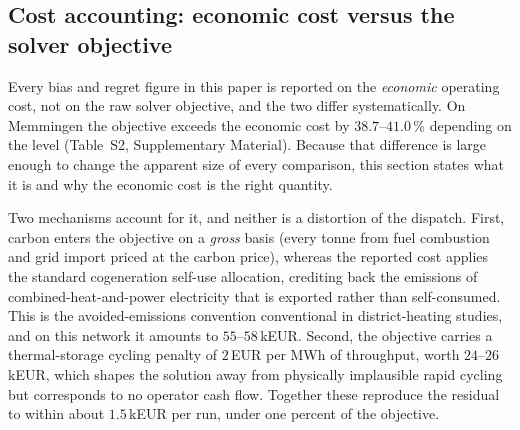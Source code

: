 
\subsection{Cost accounting: economic cost versus the solver objective}
\label{subsec:costacct}

Every bias and regret figure in this paper is reported on the \emph{economic} operating
cost, not on the raw solver objective, and the two differ systematically. On Memmingen the
objective exceeds the economic cost by $38.7$--$41.0$\,\% depending on the level
(Table~S2, Supplementary Material). Because that difference is large enough to change the
apparent size of every comparison, this section states what it is and why the economic cost is the
right quantity.

Two mechanisms account for it, and neither is a distortion of the dispatch. First, carbon
enters the objective on a \emph{gross} basis (every tonne from fuel combustion and grid
import priced at the carbon price), whereas the reported cost applies the standard
cogeneration self-use allocation, crediting back the emissions of combined-heat-and-power
electricity that is exported rather than self-consumed. This is the avoided-emissions
convention conventional in district-heating studies, and on this network it amounts to
$55$--$58$\,kEUR. Second, the objective carries a thermal-storage cycling penalty of
$2$\,EUR per MWh of throughput, worth $24$--$26$\,kEUR, which shapes the solution away from
physically implausible rapid cycling but corresponds to no operator cash flow. Together
these reproduce the residual to within about $1.5$\,kEUR per run, under one percent of the
objective.

